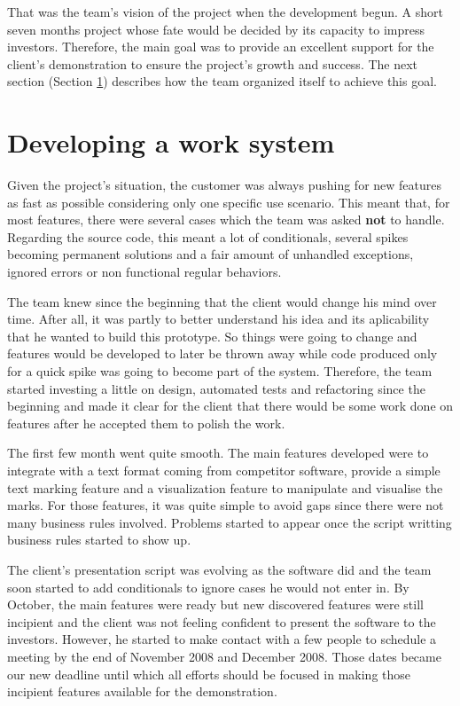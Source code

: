 \documentclass[lnbip]{svmultln}
\begin{document}
That was the team's vision of the project when the development
begun. A short seven months project whose fate would be decided by its
capacity to impress investors. Therefore, the main goal was to provide
an excellent support for the client's demonstration to ensure the
project's growth and success. The next section (Section
\ref{sec:working}) describes how the team organized itself to achieve
this goal.

\section{Developing a work system}
\label{sec:working}

Given the project's situation, the customer was always pushing for new
features as fast as possible considering only one specific use
scenario. This meant that, for most features, there were several cases
which the team was asked \textbf{not} to handle. Regarding the source
code, this meant a lot of conditionals, several spikes becoming
permanent solutions and a fair amount of unhandled exceptions, ignored
errors or non functional regular behaviors.

The team knew since the beginning that the client would change his
mind over time. After all, it was partly to better understand his idea
and its aplicability that he wanted to build this prototype. So things
were going to change and features would be developed to later be
thrown away while code produced only for a quick spike was going to
become part of the system. Therefore, the team started investing a
little on design, automated tests and refactoring since the beginning
and made it clear for the client that there would be some work done on
features after he accepted them to polish the work.

The first few month went quite smooth. The main features developed
were to integrate with a text format coming from competitor software,
provide a simple text marking feature and a visualization feature to
manipulate and visualise the marks. For those features, it was quite
simple to avoid gaps since there were not many business rules
involved. Problems started to appear once the script writting business
rules started to show up.

The client's presentation script was evolving as the software did and
the team soon started to add conditionals to ignore cases he would not
enter in. By October, the main features were ready but new discovered
features were still incipient and the client was not feeling confident
to present the software to the investors. However, he started to make
contact with a few people to schedule a meeting by the end of November
2008 and December 2008. Those dates became our new deadline until
which all efforts should be focused in making those incipient features
available for the demonstration.
\end{document}
